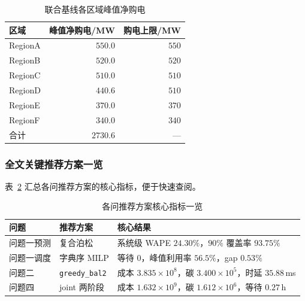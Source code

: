 \documentclass[UTF8,a4paper,zihao=-4]{ctexart}
\begin{document}
\begin{table}[H]
\centering
\small
\caption{联合基线各区域峰值净购电}
\label{tab:app-q4-peak}
\begin{tabular}{lrr}
\toprule
区域 & 峰值净购电/MW & 购电上限/MW \\
\midrule
RegionA & $550.0$ & $550$ \\
RegionB & $520.0$ & $520$ \\
RegionC & $510.0$ & $510$ \\
RegionD & $440.6$ & $510$ \\
RegionE & $370.0$ & $370$ \\
RegionF & $340.0$ & $340$ \\
\midrule
合计 & $2730.6$ & --- \\
\bottomrule
\end{tabular}
\end{table}

\subsubsection{全文关键推荐方案一览}

表~\ref{tab:app-recommend} 汇总各问推荐方案的核心指标，便于快速查阅。

\begin{table}[H]
\centering
\footnotesize
\caption{各问推荐方案核心指标一览}
\label{tab:app-recommend}
\setlength{\tabcolsep}{3.5pt}
\begin{tabular}{llp{6.2cm}}
\toprule
问题 & 推荐方案 & 核心结果 \\
\midrule
问题一预测 & 复合泊松 & 系统级 WAPE $24.30\%$，$90\%$ 覆盖率 $93.75\%$ \\
问题一调度 & 字典序 MILP & 等待 $0$，峰值利用率 $56.5\%$，gap $0.53\%$ \\
问题二 & \texttt{greedy\_bal2} & 成本 $3.835\times10^8$，碳 $3.400\times10^5$，时延 $35.88$\,ms \\
问题四 & joint 两阶段 & 成本 $1.632\times10^9$，碳 $1.612\times10^6$，等待 $0.27$\,h \\
\bottomrule
\end{tabular}
\end{table}
\end{document}
